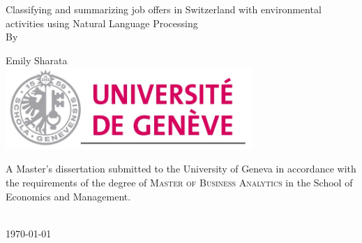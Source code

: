\begin{titlepage}
    \begin{center}
        \vspace*{1cm}
        {\huge
        Classifying and summarizing job offers in Switzerland with environmental activities using Natural Language Processing }
        \vspace{0.5cm}
        \\
        {\large By}
        \\
        \vspace{5mm}
        {\large Emily Sharata\\

        \vspace{1cm}
       \includegraphics[width=0.7\textwidth]{logos/Logo_of_the_University_of_Geneva.jpeg}
       \\

        \vspace{5cm}      
        \begin{minipage}{10cm}
        \center A Master's dissertation submitted to the University of Geneva in accordance with the requirements of the degree of \textsc{Master of Business Analytics} in the School of Economics and Management.
        \end{minipage}\\
        \vspace{0.8cm}
        \today
        
}    \end{center}
  
 

\end{titlepage}